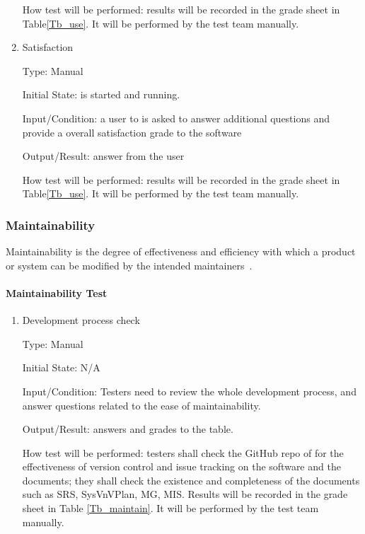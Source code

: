 \documentclass[12pt, titlepage]{article}
\begin{document}
\begin{enumerate}
How test will be performed: results will be recorded in the grade sheet in
Table\ref{Tb_use}. It will be performed by the test team manually.
					
\item{Satisfaction}

Type: Manual
					
Initial State: \progname{} is started and running.
					
Input/Condition: a user to \progname{} is asked to answer additional questions
and provide a overall satisfaction grade to the software
					
Output/Result: answer from the user
					
How test will be performed: results will be recorded in the grade sheet in
Table\ref{Tb_use}. It will be performed by the test team manually.

\end{enumerate}

\subsubsection{Maintainability}
\label{sec_Maintaintest} Maintainability is the degree of effectiveness and
efficiency with which a product or system can be modified by the intended
maintainers~\cite{ISO/IEC25010:2011}.

\paragraph{Maintainability Test}

\begin{enumerate}

\item{Development process check}

Type: Manual
					
Initial State: N/A
					
Input/Condition: Testers need to review the whole development process, and
answer questions related to the ease of maintainability.
					
Output/Result: answers and grades to the table.
					
How test will be performed: testers shall check the GitHub repo of \progname{}
for the effectiveness of version control and issue tracking on the software and
the documents; they shall check the existence and completeness of the documents
such as SRS, SysVnVPlan, MG, MIS. Results will be recorded in the grade sheet
in Table \ref{Tb_maintain}. It will be performed by the test team manually.
\end{enumerate}
\end{document}
